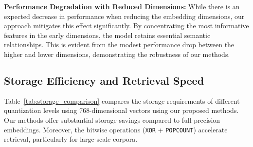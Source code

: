 \textbf{Performance Degradation with Reduced Dimensions:} While there is an expected decrease in performance when reducing the embedding dimensions, our approach mitigates this effect significantly. By concentrating the most informative features in the early dimensions, the model retains essential semantic relationships. This is evident from the modest performance drop between the higher and lower dimensions, demonstrating the robustness of our methods.

\subsection{Storage Efficiency and Retrieval Speed}

Table~\ref{tab:storage_comparison} compares the storage requirements of different quantization levels using 768-dimensional vectors using our proposed methods. 
Our methods offer substantial storage savings compared to full-precision embeddings. 
Moreover, the bitwise operations (\texttt{XOR} + \texttt{POPCOUNT}) accelerate retrieval, particularly for large-scale corpora.


\begin{table}[h]
    \centering
    \caption{Storage comparison for different embedding formats (768-dimensional vector)}
    \label{tab:storage_comparison}
\end{table}

